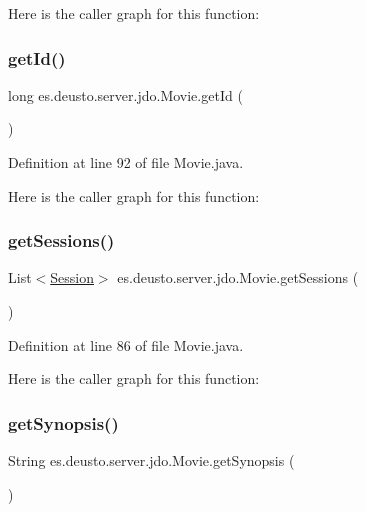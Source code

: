 Here is the caller graph for this function\+:
\mbox{\label{classes_1_1deusto_1_1server_1_1jdo_1_1_movie_a4d2758ed2b7a03bd95646f67c046e043}} 
\subsubsection{\texorpdfstring{getId()}{getId()}}
{\footnotesize\ttfamily long es.\+deusto.\+server.\+jdo.\+Movie.\+get\+Id (\begin{DoxyParamCaption}{ }\end{DoxyParamCaption})}



Definition at line 92 of file Movie.\+java.

Here is the caller graph for this function\+:
\mbox{\label{classes_1_1deusto_1_1server_1_1jdo_1_1_movie_a8d94f72339ed5601515e139de313e181}} 
\subsubsection{\texorpdfstring{getSessions()}{getSessions()}}
{\footnotesize\ttfamily List$<$\mbox{\hyperlink{classes_1_1deusto_1_1server_1_1jdo_1_1_session}{Session}}$>$ es.\+deusto.\+server.\+jdo.\+Movie.\+get\+Sessions (\begin{DoxyParamCaption}{ }\end{DoxyParamCaption})}



Definition at line 86 of file Movie.\+java.

Here is the caller graph for this function\+:
\mbox{\label{classes_1_1deusto_1_1server_1_1jdo_1_1_movie_a3cd6a8dbcfc02f646bb21d212030dbeb}} 
\subsubsection{\texorpdfstring{getSynopsis()}{getSynopsis()}}
{\footnotesize\ttfamily String es.\+deusto.\+server.\+jdo.\+Movie.\+get\+Synopsis (\begin{DoxyParamCaption}{ }\end{DoxyParamCaption})}



